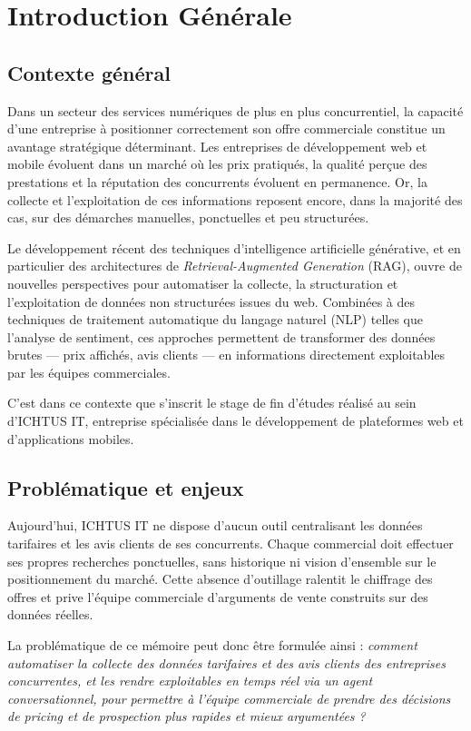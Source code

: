 \section{Introduction Générale}

\subsection{Contexte général}

Dans un secteur des services numériques de plus en plus concurrentiel, la capacité d'une entreprise à
positionner correctement son offre commerciale constitue un avantage stratégique déterminant. Les
entreprises de développement web et mobile évoluent dans un marché où les prix pratiqués, la qualité
perçue des prestations et la réputation des concurrents évoluent en permanence. Or, la collecte et
l'exploitation de ces informations reposent encore, dans la majorité des cas, sur des démarches manuelles,
ponctuelles et peu structurées.

Le développement récent des techniques d'intelligence artificielle générative, et en particulier des
architectures de \textit{Retrieval-Augmented Generation} (RAG), ouvre de nouvelles perspectives pour
automatiser la collecte, la structuration et l'exploitation de données non structurées issues du web. Combinées
à des techniques de traitement automatique du langage naturel (NLP) telles que l'analyse de sentiment,
ces approches permettent de transformer des données brutes --- prix affichés, avis clients --- en
informations directement exploitables par les équipes commerciales.

C'est dans ce contexte que s'inscrit le stage de fin d'études réalisé au sein d'ICHTUS IT, entreprise
spécialisée dans le développement de plateformes web et d'applications mobiles.

\subsection{Problématique et enjeux}

Aujourd'hui, ICHTUS IT ne dispose d'aucun outil centralisant les données tarifaires et les avis clients de
ses concurrents. Chaque commercial doit effectuer ses propres recherches ponctuelles, sans historique ni
vision d'ensemble sur le positionnement du marché. Cette absence d'outillage ralentit le chiffrage des
offres et prive l'équipe commerciale d'arguments de vente construits sur des données réelles.

La problématique de ce mémoire peut donc être formulée ainsi : \textit{comment automatiser la collecte des
données tarifaires et des avis clients des entreprises concurrentes, et les rendre exploitables en temps réel
via un agent conversationnel, pour permettre à l'équipe commerciale de prendre des décisions de pricing et
de prospection plus rapides et mieux argumentées ?}

